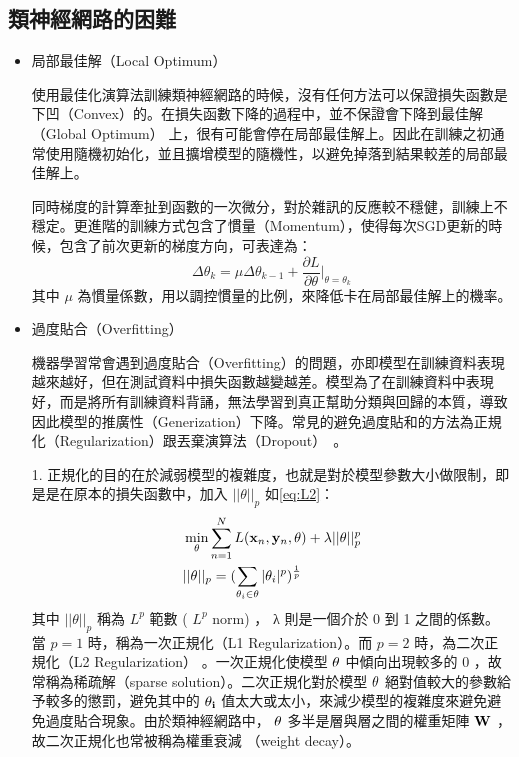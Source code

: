 \subsection{類神經網路的困難}
\begin{itemize}
\item{局部最佳解（Local Optimum）}

	使用最佳化演算法訓練類神經網路的時候，沒有任何方法可以保證損失函數是下凹（Convex）的。在損失函數下降的過程中，並不保證會下降到最佳解（Global Optimum） 上，很有可能會停在局部最佳解上。因此在訓練之初通常使用隨機初始化，並且擴增模型的隨機性，以避免掉落到結果較差的局部最佳解上。

同時梯度的計算牽扯到函數的一次微分，對於雜訊的反應較不穩健，訓練上不穩定。更進階的訓練方式包含了慣量（Momentum），使得每次SGD更新的時候，包含了前次更新的梯度方向，可表達為：
\begin{equation}
\Delta \theta_{k} =  \mu \Delta \theta_{k-1} + \frac{\partial L}{\partial \theta} \biggr|_{\theta = \theta_k}
\end{equation}
其中 $ \mu $ 為慣量係數，用以調控慣量的比例，來降低卡在局部最佳解上的機率。
\item{ 過度貼合（Overfitting）}
	
	機器學習常會遇到過度貼合（Overfitting）的問題，亦即模型在訓練資料表現越來越好，但在測試資料中損失函數越變越差。模型為了在訓練資料中表現好，而是將所有訓練資料背誦，無法學習到真正幫助分類與回歸的本質，導致因此模型的推廣性（Generization）下降。常見的避免過度貼和的方法為正規化（Regularization）跟丟棄演算法（Dropout）~\cite{srivastava2014dropout}。

	1. 正規化的目的在於減弱模型的複雜度，也就是對於模型參數大小做限制，即是是在原本的損失函數中，加入 $ ||\theta||_p $ 如\ref{eq:L2}：
\begin{equation}
\label{eq:L2}
\begin{aligned}
&\min_{\theta}{ \sum_{n=1}^{N}{ {L( \bold{x}_n ,\bold{y}_n,\theta)}}+\lambda||\theta||_p^p}
\\
&||\theta||_p = ( \sum_{\theta_i \in \bold{\theta}}{|\theta_i|^p} )^\frac{1}{p}
\end{aligned}
\end{equation}
其中 $ ||\theta||_p $  稱為  $ L^p $  範數 (  $ L^ p $   norm) ， λ 則是一個介於 0 到 1 之間的係數。
當  $ p = 1 $  時，稱為一次正規化（L1 Regularization）。而  $ p =
2 $ 時，為二次正規化（L2 Regularization）
。一次正規化使模型 $ \bold{\theta} $ 
中傾向出現較多的 $ 0 $ ，故常稱為稀疏解（sparse solution）。二次正規化對於模型
 $ \bold{\theta} $ 
絕對值較大的參數給予較多的懲罰，避免其中的 $ \bold{\theta_i} $ 值太大或太小，來減少模型的複雜度來避免避免過度貼合現象。由於類神經網路中， $ \bold{\theta} $ 
多半是層與層之間的權重矩陣 $ \bold{W} $  ，故二次正規化也常被稱為權重衰減 （weight
decay）。


\end{itemize}
